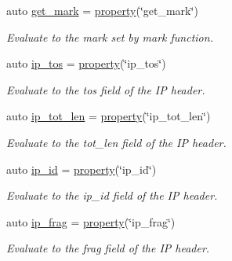 \begin{DoxyCompactItemize}
auto \hyperlink{namespacepfq_1_1lang_1_1anonymous__namespace_02default_8hpp_03_ab733e24b3ca86450bea0b0888a6327d2}{get\+\_\+mark} = \hyperlink{namespacepfq_1_1lang_a1249450e72229273b0db707a286aea91}{property}(\char`\"{}get\+\_\+mark\char`\"{})
\begin{DoxyCompactList}\small\item\em Evaluate to the mark set by {\ttfamily mark} function. \end{DoxyCompactList}\item 
auto \hyperlink{namespacepfq_1_1lang_1_1anonymous__namespace_02default_8hpp_03_acc5d2b786c39d4177ab37ee16ee2295d}{ip\+\_\+tos} = \hyperlink{namespacepfq_1_1lang_a1249450e72229273b0db707a286aea91}{property}(\char`\"{}ip\+\_\+tos\char`\"{})
\begin{DoxyCompactList}\small\item\em Evaluate to the {\ttfamily tos} field of the IP header. \end{DoxyCompactList}\item 
auto \hyperlink{namespacepfq_1_1lang_1_1anonymous__namespace_02default_8hpp_03_a48d42ce1bea31f55be3377e8f2c41bbe}{ip\+\_\+tot\+\_\+len} = \hyperlink{namespacepfq_1_1lang_a1249450e72229273b0db707a286aea91}{property}(\char`\"{}ip\+\_\+tot\+\_\+len\char`\"{})
\begin{DoxyCompactList}\small\item\em Evaluate to the {\ttfamily tot\+\_\+len} field of the IP header. \end{DoxyCompactList}\item 
auto \hyperlink{namespacepfq_1_1lang_1_1anonymous__namespace_02default_8hpp_03_a87620275a9e9760978d5660be0582852}{ip\+\_\+id} = \hyperlink{namespacepfq_1_1lang_a1249450e72229273b0db707a286aea91}{property}(\char`\"{}ip\+\_\+id\char`\"{})
\begin{DoxyCompactList}\small\item\em Evaluate to the {\ttfamily ip\+\_\+id} field of the IP header. \end{DoxyCompactList}\item 
auto \hyperlink{namespacepfq_1_1lang_1_1anonymous__namespace_02default_8hpp_03_a46050d7137792fba0ca6d1b9cb75ad0d}{ip\+\_\+frag} = \hyperlink{namespacepfq_1_1lang_a1249450e72229273b0db707a286aea91}{property}(\char`\"{}ip\+\_\+frag\char`\"{})
\begin{DoxyCompactList}\small\item\em Evaluate to the {\ttfamily frag} field of the IP header. \end{DoxyCompactList}\item 

\end{DoxyCompactItemize}
